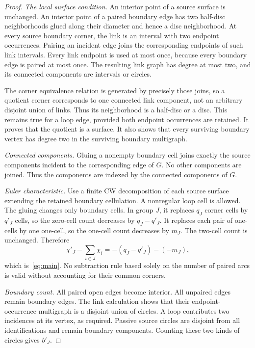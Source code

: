 \documentclass[11pt]{article}
\theoremstyle{definition}
\theoremstyle{remark}\newtheorem{remark}[theorem]{Remark}
\begin{document}
\begin{proof}
\emph{The local surface condition.} An interior point of a source surface is unchanged. An interior point of a paired boundary edge has two half-disc neighborhoods glued along their diameter and hence a disc neighborhood. At every source boundary corner, the link is an interval with two endpoint occurrences. Pairing an incident edge joins the corresponding endpoints of such link intervals. Every link endpoint is used at most once, because every boundary edge is paired at most once. The resulting link graph has degree at most two, and its connected components are intervals or circles.

The corner equivalence relation is generated by precisely those joins, so a quotient corner corresponds to one connected link component, not an arbitrary disjoint union of links. Thus its neighborhood is a half-disc or a disc. This remains true for a loop edge, provided both endpoint occurrences are retained. It proves that the quotient is a surface. It also shows that every surviving boundary vertex has degree two in the surviving boundary multigraph.

\emph{Connected components.} Gluing a nonempty boundary cell joins exactly the source components incident to the corresponding edge of $G$. No other components are joined. Thus the components are indexed by the connected components of $G$.

\emph{Euler characteristic.} Use a finite CW decomposition of each source surface extending the retained boundary cellulation. A nonregular loop cell is allowed. The gluing changes only boundary cells. In group $J$, it replaces $q_J$ corner cells by $q'_J$ cells, so the zero-cell count decreases by $q_J-q'_J$. It replaces each pair of one-cells by one one-cell, so the one-cell count decreases by $m_J$. The two-cell count is unchanged. Therefore
\[
 \chi'_J-\sum_{i\in J}\chi_i
       =-(q_J-q'_J)-(-m_J),
\]
which is~\eqref{eq:main}. No subtraction rule based solely on the number of paired arcs is valid without accounting for their common corners.

\emph{Boundary count.} All paired open edges become interior. All unpaired edges remain boundary edges. The link calculation shows that their endpoint-occurrence multigraph is a disjoint union of circles. A loop contributes two incidences at its vertex, as required. Passive source circles are disjoint from all identifications and remain boundary components. Counting these two kinds of circles gives $b'_J$.


\end{proof}
\end{document}
